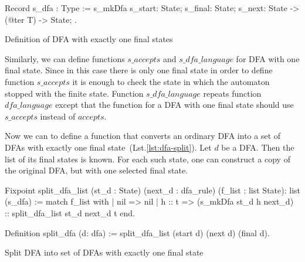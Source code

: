 
\begin{listing}[h]
    \begin{pyglist}[language=coq, numbers=none, numbersep=5pt]
  Record s_dfa : Type :=
    s_mkDfa {
      s_start: State;
      s_final: State;
      s_next: State -> (@ter T) -> State;
  }.      
    \end{pyglist}
    \caption{Definition of DFA with exactly one final states}
    \label{lst:dfa-one-ss}
\end{listing}
  
Similarly, we can define functions $\textit{s\_accepts}$ and $\textit{s\_dfa\_language}$ for DFA with one final state.
Since in this case there is only one final state in order to define function $\textit{s\_accepts}$ it is enough to check the state in which the automaton stopped with the finite state. Function $\textit{s\_dfa\_language}$ repeats function $\textit{dfa\_language}$ except that the function for a DFA with one final state should use $\textit{s\_accepts}$ instead of $\textit{accepts}$.



Now we can to define a function that converts an ordinary DFA into a set of DFAs with exactly one final state~(Lst.\ref{lst:dfa-split}).
Let $d$ be a DFA. Then the list of its final states is known. 
For each such state, one can construct a copy of the original DFA, but with one selected final state.

\begin{listing}[h]
    \begin{pyglist}[language=coq, numbers=none, numbersep=5pt]
  Fixpoint split_dfa_list 
      (st_d : State) 
      (next_d : dfa_rule) 
      (f_list : list State): list (s_dfa) :=
    match f_list with
    | nil => nil
    | h :: t => (s_mkDfa st_d h next_d) 
                :: split_dfa_list st_d next_d t
    end.    
 
 Definition split_dfa (d: dfa) := 
   split_dfa_list (start d) (next d) (final d).
    \end{pyglist}
    \caption{Split DFA into set of DFAs with exactly one final state}
    \label{lst:dfa-split}
\end{listing}


